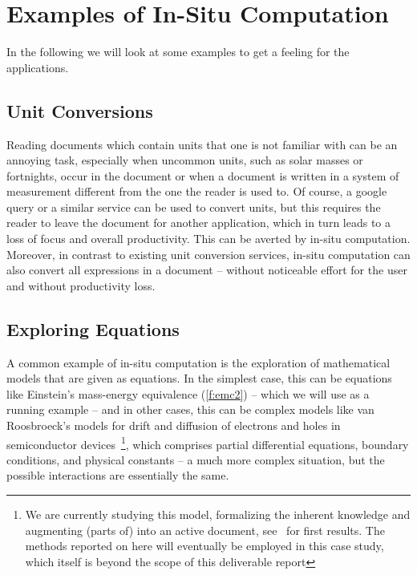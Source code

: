 \section{Examples of In-Situ Computation}\label{sec:examples}

In the following we will look at some examples to get a feeling for the applications.

\subsection{Unit Conversions}\label{sec:ex:units}
Reading documents which contain units that one is not familiar with can be an annoying
task, especially when uncommon units, such as solar masses or fortnights, occur in the
document or when a document is written in a system of measurement different from the one
the reader is used to.  Of course, a google query or a similar service can be used to
convert units, but this requires the reader to leave the document for another application,
which in turn leads to a loss of focus and overall productivity.  This can be averted by
in-situ computation. Moreover, in contrast to existing unit conversion services, in-situ
computation can also convert all expressions in a document -- without noticeable effort
for the user and without productivity loss.


\subsection{Exploring Equations}\label{sec:ex:equations}

A common example of in-situ computation is the exploration of mathematical models that are
given as equations. In the simplest case, this can be equations like Einstein's
mass-energy equivalence (\ref{f:emc2}) -- which we will use as a running example -- and in
other cases, this can be complex models like van Roosbroeck's models for drift and
diffusion of electrons and holes in semiconductor devices~\cite{FarRotDoa:nmddm16}\footnote{We
  are currently studying this model, formalizing the inherent knowledge and augmenting
  (parts of) \cite{FarRotDoa:nmddm16} into an active document, see~\cite{KohKopMueTab:RCS} for
  first results. The methods reported on here will eventually be employed in this case
  study, which itself is beyond the scope of this deliverable report}, which comprises
partial differential equations, boundary conditions, and physical constants -- a much more
complex situation, but the possible interactions are essentially the same. 

